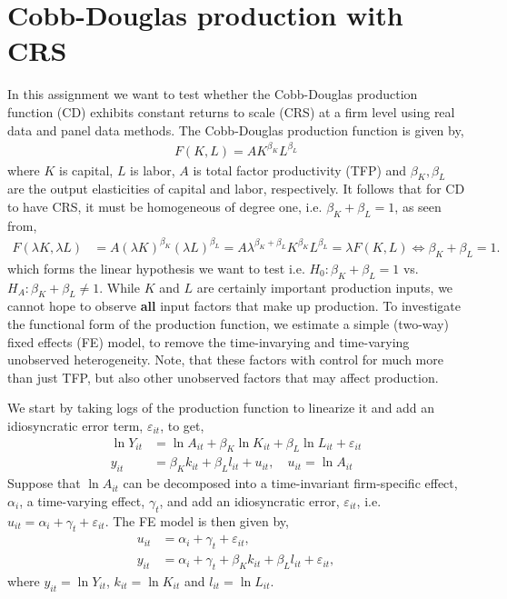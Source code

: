 \section{Cobb-Douglas production with CRS}

In this assignment we want to test whether the Cobb-Douglas production function (CD) exhibits constant returns to scale (CRS) at a firm level using real data and panel data methods. The Cobb-Douglas production function is given by,
\begin{align*}
    F(K,L) = A K^{\beta_K} L^{\beta_L}
\end{align*}
where $K$ is capital, $L$ is labor, $A$ is total factor productivity (TFP) and $\beta_K, \beta_L$ are the output elasticities of capital and labor, respectively.
It follows that for CD to have CRS, it must be homogeneous of degree one, i.e. $\beta_K + \beta_L = 1$, as seen from,
\begin{align*}
    F(\lambda K, \lambda L) &= A (\lambda K)^{\beta_K} (\lambda L)^{\beta_L} = A \lambda^{\beta_K + \beta_L} K^{\beta_K} L^{\beta_L} = \lambda F(K,L) \iff \beta_K + \beta_L = 1.
\end{align*} 
which forms the linear hypothesis we want to test i.e. $H_0: \beta_K + \beta_L = 1$ vs. $H_A: \beta_K + \beta_L \neq 1$.
While $K$ and $L$ are certainly important production inputs, we cannot hope to observe \textbf{all} input factors that make up production. To investigate the functional form of the production function, we estimate a simple (two-way) fixed effects (FE) model, to remove the time-invarying and time-varying unobserved heterogeneity. Note, that these factors with control for much more than just TFP, but also other unobserved factors that may affect production. 

We start by taking logs of the production function to linearize it and add an idiosyncratic error term, $\varepsilon_{it}$, to get,
\begin{align*}
    \ln Y_{it} &= \ln A_{it} + \beta_K \ln K_{it} + \beta_L \ln L_{it} + \varepsilon_{it} \\
    y_{it} &= \beta_K k_{it} + \beta_L l_{it} + u_{it}, \quad u_{it} = \ln A_{it}
\end{align*}
Suppose that $\ln A_{it}$ can be decomposed into a time-invariant firm-specific effect, $\alpha_i$, a time-varying effect, $\gamma_t$, and add an idiosyncratic error, $\varepsilon_{it}$, i.e. $u_{it} = \alpha_i + \gamma_t + \varepsilon_{it}$. The FE model is then given by,
\begin{align*}
    u_{it} &= \alpha_i + \gamma_t + \varepsilon_{it}, \\
    y_{it} &= \alpha_i + \gamma_t + \beta_K k_{it} + \beta_L l_{it} + \varepsilon_{it},
\end{align*} 
where $y_{it} = \ln Y_{it}$, $k_{it} = \ln K_{it}$ and $l_{it} = \ln L_{it}$. 

